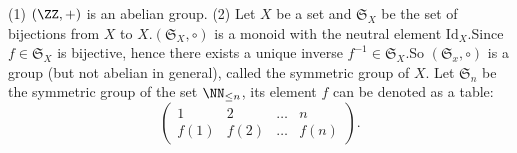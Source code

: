 \begin{exampleenv}
    \quad
    \newline
    (1) $(\ZZ, +)$ is an abelian group.
    \newline
    (2) Let $X$ be a set and $\mathfrak{S}_X$ be the set of bijections from $X$ to $X$.$(\mathfrak{S}_X , \circ)$ is a monoid with the neutral element $\mathrm{Id}_X$.Since $f\in \mathfrak{S}_X $ is bijective,  hence there exists a unique inverse $f^{-1}\in \mathfrak{S} _X$.So $(\mathfrak{S} _x, \circ)$ is a group (but not abelian in general), called the symmetric group of $X$.
    \newline
    Let $\mathfrak{S} _n$ be the symmetric group of the set $\NN_{\le n}$,  its element $f$ can be denoted as a table:
    $$\begin{pmatrix}
  1&2  &\dots &n \\
  f(1)& f(2) &\dots   &f(n)
\end{pmatrix}.$$
\end{exampleenv}
